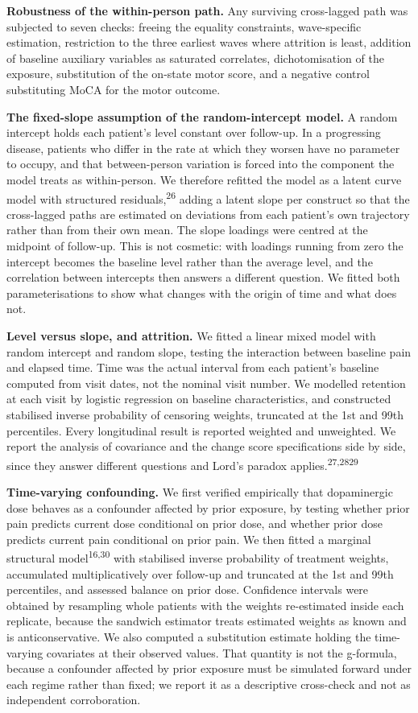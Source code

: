 \documentclass[
  english,
  12pt,
]{article}
\begin{document}
\textbf{Robustness of the within-person path.} Any surviving cross-lagged path was subjected to seven checks: freeing the equality constraints, wave-specific estimation, restriction to the three earliest waves where attrition is least, addition of baseline auxiliary variables as saturated correlates, dichotomisation of the exposure, substitution of the on-state motor score, and a negative control substituting MoCA for the motor outcome.

\textbf{The fixed-slope assumption of the random-intercept model.} A random intercept holds each patient's level constant over follow-up. In a progressing disease, patients who differ in the rate at which they worsen have no parameter to occupy, and that between-person variation is forced into the component the model treats as within-person. We therefore refitted the model as a latent curve model with structured residuals,\textsuperscript{26} adding a latent slope per construct so that the cross-lagged paths are estimated on deviations from each patient's own trajectory rather than from their own mean. The slope loadings were centred at the midpoint of follow-up. This is not cosmetic: with loadings running from zero the intercept becomes the baseline level rather than the average level, and the correlation between intercepts then answers a different question. We fitted both parameterisations to show what changes with the origin of time and what does not.

\textbf{Level versus slope, and attrition.} We fitted a linear mixed model with random intercept and random slope, testing the interaction between baseline pain and elapsed time. Time was the actual interval from each patient's baseline computed from visit dates, not the nominal visit number. We modelled retention at each visit by logistic regression on baseline characteristics, and constructed stabilised inverse probability of censoring weights, truncated at the 1st and 99th percentiles. Every longitudinal result is reported weighted and unweighted. We report the analysis of covariance and the change score specifications side by side, since they answer different questions and Lord's paradox applies.\textsuperscript{27,2829}

\textbf{Time-varying confounding.} We first verified empirically that dopaminergic dose behaves as a confounder affected by prior exposure, by testing whether prior pain predicts current dose conditional on prior dose, and whether prior dose predicts current pain conditional on prior pain. We then fitted a marginal structural model\textsuperscript{16,30} with stabilised inverse probability of treatment weights, accumulated multiplicatively over follow-up and truncated at the 1st and 99th percentiles, and assessed balance on prior dose. Confidence intervals were obtained by resampling whole patients with the weights re-estimated inside each replicate, because the sandwich estimator treats estimated weights as known and is anticonservative. We also computed a substitution estimate holding the time-varying covariates at their observed values. That quantity is not the g-formula, because a confounder affected by prior exposure must be simulated forward under each regime rather than fixed; we report it as a descriptive cross-check and not as independent corroboration.
\end{document}
